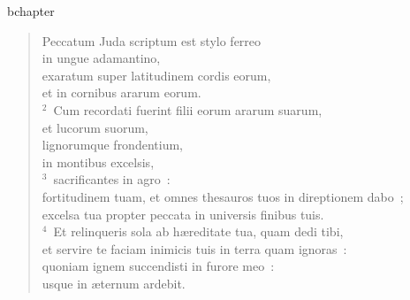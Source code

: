 bchapter\begin{flushleft}\begin{verse}\vspace{-19pt}\hspace{6pt}Peccatum Juda scriptum est stylo ferreo\\\hspace{6pt} in ungue adamantino,\\ exaratum super latitudinem cordis eorum,\\ et in cornibus ararum eorum.\\
${}^{2}$~Cum recordati fuerint filii eorum ararum suarum,\\ et lucorum suorum,\\ lignorumque frondentium,\\ in montibus excelsis,\\
${}^{3}$~sacrificantes in agro~:\\ fortitudinem tuam, et omnes thesauros tuos in direptionem dabo~;\\ excelsa tua propter peccata in universis finibus tuis.\\
${}^{4}$~Et relinqueris sola ab h\ae reditate tua, quam dedi tibi,\\ et servire te faciam inimicis tuis in terra quam ignoras~:\\ quoniam ignem succendisti in furore meo~:\\ usque in \ae ternum ardebit.\end{verse}\end{flushleft}


